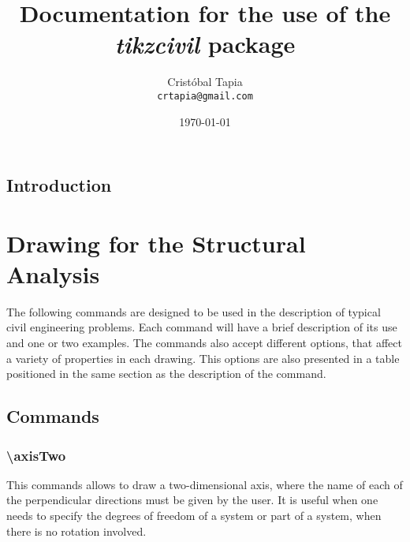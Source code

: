 \documentclass[10pt,letterpaper,oneside]{book}
\begin{document}
\begin{titlepage}
  \title{Documentation for the use of the \emph{tikzcivil} package}
  \author{Cristóbal Tapia\\
    \texttt{crtapia@gmail.com}
  }
  \date{\today}
  \maketitle
\end{titlepage}

\tableofcontents
\newpage
\section{Introduction}


\lstset{style=customasm, numbers=left, texcl=true}

\chapter{Drawing for the Structural Analysis}
The following commands are designed to be used in the description of typical civil engineering problems. Each command will have a brief description of its use and one or two examples. The commands also accept different options, that affect a variety of properties in each drawing. This options are also presented in a table positioned in the same section as the description of the command.\par

\section{Commands}

\subsection{\textbackslash axisTwo}
\label{subsec:axisTwo}
This commands allows to draw a two-dimensional axis, where the name of each of the perpendicular directions must be given by the user. It is useful when one needs to specify the degrees of freedom of a system or part of a system, when there is no rotation involved.\par
\end{document}
